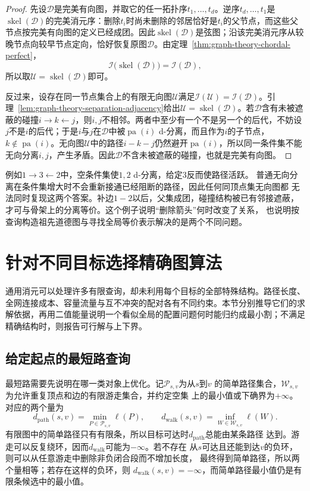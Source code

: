 \begin{proof}
先设$\mathcal{D}$是完美有向图，并取它的任一拓扑序$t_1,\ldots,t_d$。逆序$t_d,\ldots,t_1$是$\operatorname{skel}(\mathcal{D})$的完美消元序：删除$t_i$时尚未删除的邻居恰好是$t_i$的父节点，而这些父节点按完美有向图的定义已经成团。因此$\operatorname{skel}(\mathcal{D})$是弦图；沿该完美消元序从较晚节点向较早节点定向，恰好恢复原图$\mathcal{D}$。由定理~\ref{thm:graph-theory-chordal-perfect}，
\[
  \mathcal{I}\bigl(\operatorname{skel}(\mathcal{D})\bigr)
  =\mathcal{I}(\mathcal{D}),
\]
所以取$\mathcal{U}=\operatorname{skel}(\mathcal{D})$即可。

反过来，设存在同一节点集合上的有限无向图$\mathcal{U}$满足$\mathcal{I}(\mathcal{U})=\mathcal{I}(\mathcal{D})$。引理~\ref{lem:graph-theory-separation-adjacency}给出$\mathcal{U}=\operatorname{skel}(\mathcal{D})$。若$\mathcal{D}$含有未被遮蔽的碰撞$i\to k\leftarrow j$，则$i,j$不相邻。两者中至少有一个不是另一个的后代，不妨设$j$不是$i$的后代；于是$i$与$j$在$\mathcal{D}$中被$\operatorname{pa}(i)$ d-分离，而且作为$i$的子节点，$k\notin\operatorname{pa}(i)$。无向图$\mathcal{U}$中的路径$i-k-j$仍然避开$\operatorname{pa}(i)$，所以同一条件集不能无向分离$i,j$，产生矛盾。因此$\mathcal{D}$不含未被遮蔽的碰撞，也就是完美有向图。
\end{proof}
例如$1\to3\leftarrow2$中，空条件集使$1,2$ d-分离，给定$3$反而使路径活跃。
普通无向分离在条件集增大时不会重新接通已经阻断的路径，因此任何同顶点集无向图都
无法同时复现这两个答案。补边$1-2$以后，父集成团，碰撞结构被已有邻接遮蔽，
才可与骨架上的分离等价。这个例子说明“删除箭头”何时改变了关系，
也说明按查询构造祖先道德图与寻找全局等价表示解决的是两个不同问题。

\section{针对不同目标选择精确图算法}
\label{sec:graph-theory-exact-approximate-algorithms}

通用消元可以处理许多有限查询，却未利用每个目标的全部特殊结构。路径长度、全网连接成本、容量流量与互不冲突的配对各有不同约束。本节分别推导它们的求解依据，再用二值能量说明一个看似全局的配置问题何时能归约成最小割；不满足精确结构时，则报告可行解与上下界。

\subsection{给定起点的最短路查询}
\label{sec:graph-theory-shortest-paths}

最短路需要先说明在哪一类对象上优化。记\(\mathcal{P}_{s,v}\)为从\(s\)到\(v\)
的简单路径集合，\(\mathcal{W}_{s,v}\)为允许重复顶点和边的有限游走集合，并约定空集
上的最小值或下确界为\(+\infty\)。对应的两个量为
\[
  d_{\mathrm{path}}(s,v)
  =\min_{P\in\mathcal{P}_{s,v}}\ell(P),
  \qquad
  d_{\mathrm{walk}}(s,v)
  =\inf_{W\in\mathcal{W}_{s,v}}\ell(W).
\]
有限图中的简单路径只有有限条，所以目标可达时\(d_{\mathrm{path}}\)总能由某条路径
达到。游走可以反复绕环，因而\(d_{\mathrm{walk}}\)可能为\(-\infty\)。若不存在
从\(s\)可达且还能到达\(v\)的负环，则可以从任意游走中删除非负闭合段而不增加长度，
最终得到简单路径，所以两个量相等；若存在这样的负环，则
\(d_{\mathrm{walk}}(s,v)=-\infty\)，而简单路径最小值仍是有限条候选中的最小值。


